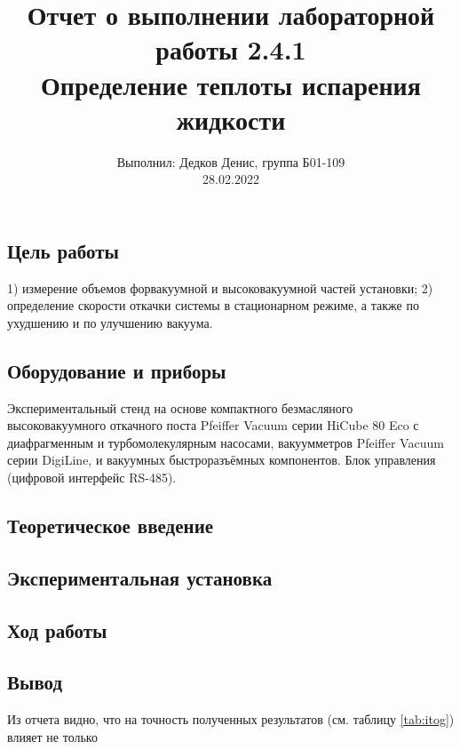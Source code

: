 \documentclass[12pt,a4paper]{article}
\author{\normalsize Выполнил: Дедков Денис, группа Б01-109 \\
	\normalsize 28.02.2022}
\date{}
\title{
	\large Отчет о выполнении лабораторной работы 2.4.1 \\
	\Large Определение теплоты испарения жидкости \\ 
	
}
\begin{document}
	\maketitle
	\subsection*{Цель работы} 
	  1) измерение объемов форвакуумной и высоковакуумной частей установки; 2) определение скорости откачки системы в стационарном режиме, а также по ухудшению и по улучшению вакуума. 
	
	\subsection*{Оборудование и приборы} Экспериментальный стенд на основе компактного безмасляного высоковакуумного откачного поста Pfeiffer Vacuum серии
	HiCube 80 Eco с диафрагменным и турбомолекулярным насосами, вакуумметров Pfeiffer Vacuum серии DigiLine, и вакуумных быстроразъёмных
	компонентов. Блок управления (цифровой интерфейс RS-485).
	
	
\subsection*{Теоретическое введение}



\subsection*{Экспериментальная установка}



\subsection*{Ход работы}





\subsection*{Вывод}


Из отчета видно, что на точность полученных результатов (см. таблицу \ref{tab:itog}) влияет не только 
 
\end{document}
